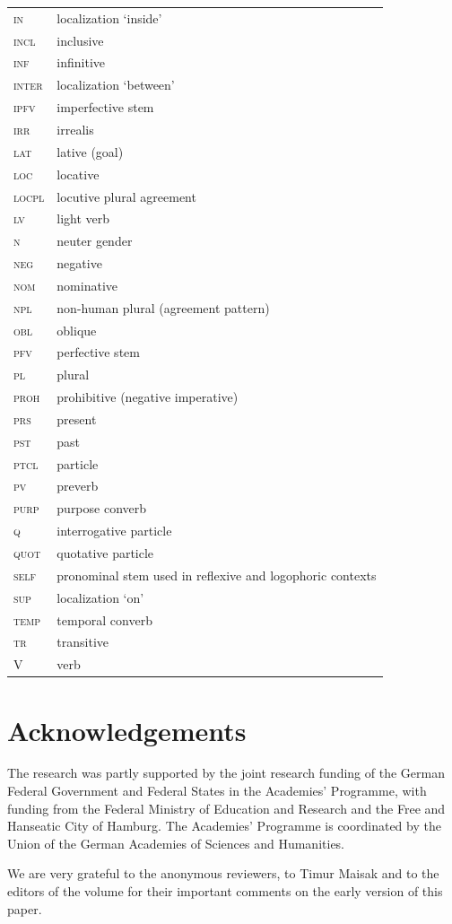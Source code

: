 \documentclass[output=paper,colorlinks,citecolor=brown]{langscibook}
\begin{document}
\begin{tabularx}{.5\textwidth}{@{}lQ@{}}
\textsc{in} & localization `inside'\\
\textsc{incl} & inclusive \\
\textsc{inf} & infinitive \\
\textsc{inter} & localization `between' \\
\textsc{ipfv} & imperfective stem \\
\textsc{irr} & irrealis\\
\textsc{lat} & lative (goal) \\
\textsc{loc} & locative \\
\textsc{locpl} & locutive plural agreement \\
\textsc{lv} & light verb \\
\textsc{n} & neuter gender \\
\textsc{neg} & negative \\
\textsc{nom} & nominative \\
\textsc{npl} & non-human plural (agreement pattern) \\
\textsc{obl} & oblique \\
\textsc{pfv} & perfective stem \\
\textsc{pl} & plural \\
\textsc{proh} & prohibitive (negative imperative) \\
\textsc{prs} & present \\
\textsc{pst} & past \\
\textsc{ptcl} & particle \\
\textsc{pv} & preverb \\
\textsc{purp} & purpose converb\\
\textsc{q} & interrogative particle \\
\textsc{quot} & quotative particle \\
\textsc{self} & pronominal stem used in reflexive and logophoric contexts \\
\textsc{sup} & localization `on' \\
\textsc{temp} & temporal converb \\
\textsc{tr} & transitive \\
V & verb
\end{tabularx}

\section*{Acknowledgements}
The research was partly supported by the joint research funding of the German Federal Government and Federal States in the Academies' Programme, with funding from the Federal Ministry of Education and Research and the Free and Hanseatic City of Hamburg. The Academies’ Programme is coordinated by the Union of the German Academies of Sciences and Humanities. 

We are very grateful to the anonymous reviewers, to Timur Maisak and to the editors of the volume for their important comments on the early version of this paper.


\printbibliography[heading=subbibliography,notkeyword=this]
\end{document}

